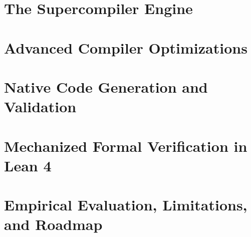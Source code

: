 \documentclass[12pt,a4paper,openright,twoside]{book}
\begin{document}
\part{The Supercompiler Engine}









\part{Advanced Compiler Optimizations}






\part{Native Code Generation and Validation}




\part{Mechanized Formal Verification in Lean 4}




\part{Empirical Evaluation, Limitations, and Roadmap}






\backmatter


\end{document}
